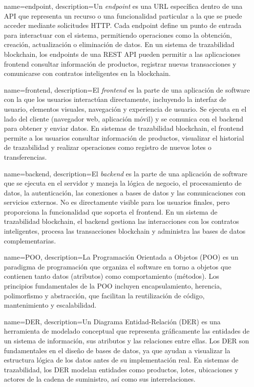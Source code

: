 {
    name=endpoint,
    description={Un \textit{endpoint} es una URL específica dentro de una API que representa un recurso o una funcionalidad particular a la que se puede acceder mediante solicitudes HTTP. Cada endpoint define un punto de entrada para interactuar con el sistema, permitiendo operaciones como la obtención, creación, actualización o eliminación de datos. En un sistema de trazabilidad blockchain, los endpoints de una REST API pueden permitir a las aplicaciones frontend consultar información de productos, registrar nuevas transacciones y comunicarse con contratos inteligentes en la blockchain.}
}


{
    name=frontend,
    description={El \textit{frontend} es la parte de una aplicación de software con la que los usuarios interactúan directamente, incluyendo la interfaz de usuario, elementos visuales, navegación y experiencia de usuario. Se ejecuta en el lado del cliente (navegador web, aplicación móvil) y se comunica con el backend para obtener y enviar datos. En sistemas de trazabilidad blockchain, el frontend permite a los usuarios consultar información de productos, visualizar el historial de trazabilidad y realizar operaciones como registro de nuevos lotes o transferencias.}
}

{
    name=backend,
    description={El \textit{backend} es la parte de una aplicación de software que se ejecuta en el servidor y maneja la lógica de negocio, el procesamiento de datos, la autenticación, las conexiones a bases de datos y las comunicaciones con servicios externos. No es directamente visible para los usuarios finales, pero proporciona la funcionalidad que soporta el frontend. En un sistema de trazabilidad blockchain, el backend gestiona las interacciones con los contratos inteligentes, procesa las transacciones blockchain y administra las bases de datos complementarias.}
}

{
    name=POO,
    description={La Programación Orientada a Objetos (POO) es un paradigma de programación que organiza el software en torno a objetos que contienen tanto datos (atributos) como comportamiento (métodos). Los principios fundamentales de la POO incluyen encapsulamiento, herencia, polimorfismo y abstracción, que facilitan la reutilización de código, mantenimiento y escalabilidad.}
}

{
    name=DER,
    description={Un Diagrama Entidad-Relación (DER) es una herramienta de modelado conceptual que representa gráficamente las entidades de un sistema de información, sus atributos y las relaciones entre ellas. Los DER son fundamentales en el diseño de bases de datos, ya que ayudan a visualizar la estructura lógica de los datos antes de su implementación real. En sistemas de trazabilidad, los DER modelan entidades como productos, lotes, ubicaciones y actores de la cadena de suministro, así como sus interrelaciones.}
}

